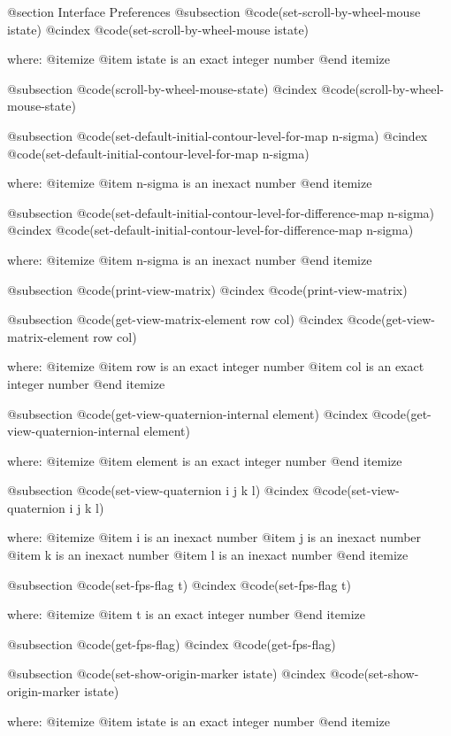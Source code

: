 @section Interface Preferences 
@subsection @code{(set-scroll-by-wheel-mouse istate)}
@cindex @code{(set-scroll-by-wheel-mouse istate)}
 
where: 
 @itemize 
     @item istate is an exact integer number
 @end itemize


@subsection @code{(scroll-by-wheel-mouse-state)}
@cindex @code{(scroll-by-wheel-mouse-state)}
 
@subsection @code{(set-default-initial-contour-level-for-map n-sigma)}
@cindex @code{(set-default-initial-contour-level-for-map n-sigma)}
 
where: 
 @itemize 
     @item n-sigma is an inexact number
 @end itemize


@subsection @code{(set-default-initial-contour-level-for-difference-map n-sigma)}
@cindex @code{(set-default-initial-contour-level-for-difference-map n-sigma)}
 
where: 
 @itemize 
     @item n-sigma is an inexact number
 @end itemize


@subsection @code{(print-view-matrix)}
@cindex @code{(print-view-matrix)}
 
@subsection @code{(get-view-matrix-element row col)}
@cindex @code{(get-view-matrix-element row col)}
 
where: 
 @itemize 
     @item row is an exact integer number
     @item col is an exact integer number
 @end itemize


@subsection @code{(get-view-quaternion-internal element)}
@cindex @code{(get-view-quaternion-internal element)}
 
where: 
 @itemize 
     @item element is an exact integer number
 @end itemize


@subsection @code{(set-view-quaternion i j k l)}
@cindex @code{(set-view-quaternion i j k l)}
 
where: 
 @itemize 
     @item i is an inexact number
     @item j is an inexact number
     @item k is an inexact number
     @item l is an inexact number
 @end itemize


@subsection @code{(set-fps-flag t)}
@cindex @code{(set-fps-flag t)}
 
where: 
 @itemize 
     @item t is an exact integer number
 @end itemize


@subsection @code{(get-fps-flag)}
@cindex @code{(get-fps-flag)}
 
@subsection @code{(set-show-origin-marker istate)}
@cindex @code{(set-show-origin-marker istate)}
 
where: 
 @itemize 
     @item istate is an exact integer number
 @end itemize


